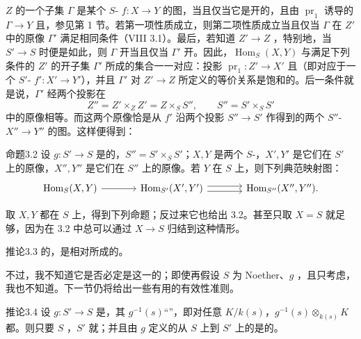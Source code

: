 $Z$ 的一个子集 $\Gamma$ 是某个 $S$- $f:X\to Y$ 的图，当且仅当它是开的，且由 $\operatorname{pr}_1$ 诱导的 $\Gamma\to Y$ 且，参见第 1 节。若第一项性质成立，则第二项性质成立当且仅当 $\Gamma$ 在 $Z'$ 中的原像 $\Gamma'$ 满足相同条件（VIII 3.1）。最后，若知道 $Z'\to Z$ ，特别地，当 $S'\to S$ 时便是如此，则 $\Gamma$ 开当且仅当 $\Gamma'$ 开。因此，$\operatorname{Hom}_S(X,Y)$ 与满足下列条件的 $Z'$ 的开子集 $\Gamma'$ 所成的集合一一对应：投影 $\operatorname{pr}_1:Z'\to X'$ 且（即对应于一个 $S'$- $f':X'\to Y'$），并且 $\Gamma'$ 对 $Z'\to Z$ 所定义的等价关系是饱和的。后一条件就是说，$\Gamma'$ 经两个投影在
\[
Z''=Z'\times_Z Z'=Z\times_S S'',\qquad S''=S'\times_S S'
\]
中的原像相等。而这两个原像恰是从 $f'$ 沿两个投影 $S''\to S'$ 作得到的两个 $S''$- $X''\to Y''$ 的图。这样便得到：
\begin{SGAresult}{命题}{3.2}
设 $g:S'\to S$ 是的，$S''=S'\times_S S'$；$X,Y$ 是两个 $S$-，$X',Y'$ 是它们在 $S'$ 上的原像，$X'',Y''$ 是它们在 $S''$ 上的原像。若 $Y$ 在 $S$ 上，则下列典范映射图：
\[
\begin{tikzcd}[column sep=large]
\operatorname{Hom}_S(X,Y)\arrow[r]&\operatorname{Hom}_{S'}(X',Y')\arrow[r,shift left=.6ex]\arrow[r,shift right=.6ex]&\operatorname{Hom}_{S''}(X'',Y'').
\end{tikzcd}
\]
\end{SGAresult}
取 $X,Y$ 都在 $S$ 上，得到下列命题；反过来它也给出 3.2。甚至只取 $X=S$ 就足够，因为在 3.2 中总可以通过 $X\to S$ 归结到这种情形。
\begin{SGAresult}{推论}{3.3}
的，是相对所成的。
\end{SGAresult}
不过，我不知道它是否必定是这一的；即使再假设 $S$ 为 Noether、$g$ ，且只考虑，我也不知道。下一节仍将给出一些有用的有效性准则。
\begin{SGAresult}{推论}{3.4}
设 $g:S'\to S$ 是，其 $g^{-1}(s)$“”，即对任意 $K/k(s)$，$g^{-1}(s)\otimes_{k(s)}K$ 都。则只要 $S$ ，$S'$ 就；并且由 $g$ 定义的从 $S$ 上到 $S'$ 上的是的。
\end{SGAresult}
